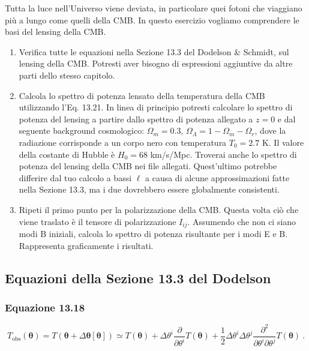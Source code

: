 \documentclass[a4paper,10pt]{article}
\newcommand{\B}{\boldsymbol}
\begin{document}
Tutta la luce nell’Universo viene deviata, in particolare quei fotoni che viaggiano più a lungo come quelli della CMB.
In questo esercizio vogliamo comprendere le basi del lensing della CMB.

\begin{enumerate}

    \item Verifica tutte le equazioni nella Sezione 13.3 del Dodelson \& Schmidt, sul lensing della CMB.
    Potresti aver bisogno di espressioni aggiuntive da altre parti dello stesso capitolo.

    \item Calcola lo spettro di potenza lensato della temperatura della CMB utilizzando l’Eq. 13.21.
    In linea di principio potresti calcolare lo spettro di potenza del lensing a partire dallo spettro di potenza allegato a $z = 0$ e dal seguente background cosmologico: $\Omega_m = 0.3$, $\Omega_\Lambda = 1 - \Omega_m - \Omega_r$, dove la radiazione corrisponde a un corpo nero con temperatura $T_0 = 2.7$ K.
    Il valore della costante di Hubble è $H_0 = 68$ km/s/Mpc.
    Troverai anche lo spettro di potenza del lensing della CMB nei file allegati.
    Quest’ultimo potrebbe differire dal tuo calcolo a bassi $\ell$ a causa di alcune approssimazioni fatte nella Sezione 13.3, ma i due dovrebbero essere globalmente consistenti.

    \item Ripeti il primo punto per la polarizzazione della CMB. Questa volta ciò che viene traslato è il tensore di polarizzazione $I_{ij}$.
    Assumendo che non ci siano modi B iniziali, calcola lo spettro di potenza risultante per i modi E e B. Rappresenta graficamente i risultati.

\end{enumerate}


\subsection{Equazioni della Sezione 13.3 del Dodelson}

\subsubsection*{Equazione 13.18}

\begin{equation} \label{eq:13.18}
    T_{\mathrm{obs}}(\B\theta) = T(\B\theta + \Delta \B\theta[\B\theta])
        \simeq T(\B\theta) + \Delta \theta^i \frac{\partial}{\partial \theta^i} T(\B\theta) + \frac{1}{2} \Delta \theta^i \Delta \theta^j \frac{\partial^2}{\partial \theta^i \partial \theta^j} T(\B\theta) \ .
\end{equation}
\end{document}
